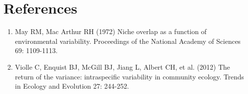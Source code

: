 \documentclass[12pt]{article}\usepackage[]{graphicx}\usepackage[]{color}
\begin{document}
 
\cleardoublepage
\section*{References}

\begin{enumerate}
\item May RM, Mac Arthur RH (1972) Niche overlap as a function of environmental variability. Proceedings of the National Academy of Sciences 69: 1109-1113.

\item Violle C, Enquist BJ, McGill BJ, Jiang L, Albert CH, et al. (2012) The return of the variance: intraspecific variability in community ecology. Trends in Ecology and Evolution 27: 244-252.
\end{enumerate}

\clearpage

\listoffigures %
\listoftables %
\end{document}
